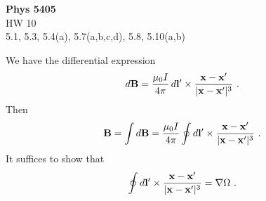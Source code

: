 \documentclass[12pt]{article}
\newcommand{\x}{{\bf x}}
\newcommand{\B}{{\bf B}}
\newcommand{\bl}{{\bf l}}
\begin{document}
\begin{center}
{\bf Phys 5405}\\
HW 10 \\
5.1, 5.3, 5.4(a), 5.7(a,b,c,d), 5.8, 5.10(a,b)

\end{center}
We have the differential expression
\begin{equation}
    d {\bf B} = \frac{\mu_0 I}{4\pi}\, d\bl' \times \frac{\x - \x'}{|\x - \x'|^3}~.
\end{equation}
Then
\begin{equation}
    \B = \int d \B = \frac{\mu_0 I}{4\pi} \oint d \bl' \times \frac{\x - \x'}{|\x - \x'|^3}~.
\end{equation}
It suffices to show that
\begin{equation}
    \oint d\bl' \times \frac{\x - \x'}{|\x - \x'|^3} = \nabla \Omega~.
\end{equation}
\end{document}
